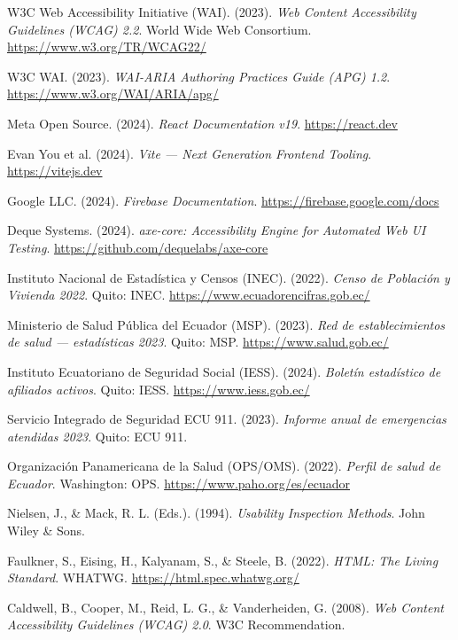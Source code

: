 \documentclass[12pt, a4paper]{report}
\begin{document}
\begin{enumerate}[label={[\arabic*]}]
  \item W3C Web Accessibility Initiative (WAI). (2023). \textit{Web Content Accessibility Guidelines (WCAG) 2.2}. World Wide Web Consortium. \url{https://www.w3.org/TR/WCAG22/}

  \item W3C WAI. (2023). \textit{WAI-ARIA Authoring Practices Guide (APG) 1.2}. \url{https://www.w3.org/WAI/ARIA/apg/}

  \item Meta Open Source. (2024). \textit{React Documentation v19}. \url{https://react.dev}

  \item Evan You et al. (2024). \textit{Vite --- Next Generation Frontend Tooling}. \url{https://vitejs.dev}

  \item Google LLC. (2024). \textit{Firebase Documentation}. \url{https://firebase.google.com/docs}

  \item Deque Systems. (2024). \textit{axe-core: Accessibility Engine for Automated Web UI Testing}. \url{https://github.com/dequelabs/axe-core}

  \item Instituto Nacional de Estadística y Censos (INEC). (2022). \textit{Censo de Población y Vivienda 2022}. Quito: INEC. \url{https://www.ecuadorencifras.gob.ec/}

  \item Ministerio de Salud Pública del Ecuador (MSP). (2023). \textit{Red de establecimientos de salud — estadísticas 2023}. Quito: MSP. \url{https://www.salud.gob.ec/}

  \item Instituto Ecuatoriano de Seguridad Social (IESS). (2024). \textit{Boletín estadístico de afiliados activos}. Quito: IESS. \url{https://www.iess.gob.ec/}

  \item Servicio Integrado de Seguridad ECU 911. (2023). \textit{Informe anual de emergencias atendidas 2023}. Quito: ECU 911.

  \item Organización Panamericana de la Salud (OPS/OMS). (2022). \textit{Perfil de salud de Ecuador}. Washington: OPS. \url{https://www.paho.org/es/ecuador}

  \item Nielsen, J., \& Mack, R. L. (Eds.). (1994). \textit{Usability Inspection Methods}. John Wiley \& Sons.

  \item Faulkner, S., Eising, H., Kalyanam, S., \& Steele, B. (2022). \textit{HTML: The Living Standard}. WHATWG. \url{https://html.spec.whatwg.org/}

  \item Caldwell, B., Cooper, M., Reid, L. G., \& Vanderheiden, G. (2008). \textit{Web Content Accessibility Guidelines (WCAG) 2.0}. W3C Recommendation.
\end{enumerate}
\end{document}
